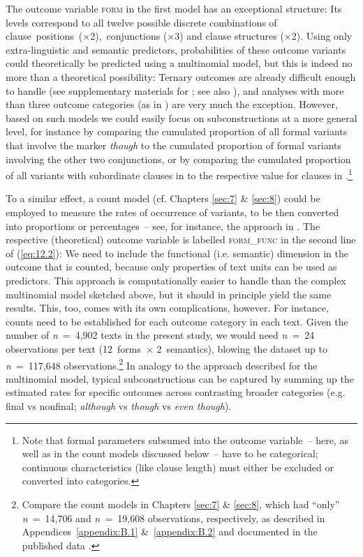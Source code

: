The outcome variable \textsc{form} in the first model has an exceptional structure: Its levels correspond to all twelve possible discrete combinations of clause~positions~(×2),~conjunctions (×3) and clause structures (×2). Using only extra-lin\-guis\-tic and semantic predictors, probabilities of these outcome variants could theoretically be predicted using a multinomial model, but this is indeed no more than a theoretical possibility: Ternary outcomes are already difficult enough to handle (see supplementary materials for ; see also \citealt{FahyEtAl2022}), and analyses with more than three outcome categories (as in \citealt{SchützlerHerzky2021}) are very much the exception. However, based on such models we could easily focus on subconstructions at a more general level, for instance by comparing the cumulated proportion of all formal variants that involve the marker \textit{though} to the cumulated proportion of formal variants involving the other two conjunctions, or by comparing the cumulated proportion of all variants with subordinate clauses in  to the respective value for clauses in .{\footnote{Note that formal parameters subsumed into the outcome variable~– here, as well as in the count models discussed below~– have to be categorical; continuous characteristics (like clause length) must either be excluded or converted into categories.}}

To a similar effect, a count model (cf. Chapters \ref{sec:7} \& \ref{sec:8}) could be employed to measure the rates of occurrence of variants, to be then converted into proportions or percentages~– see, for instance, the approach in \citet{Schützler2022}. The respective (theoretical) outcome variable is labelled \textsc{form\_func} in the second line of (\ref{eq:12.2}): We need to include the functional (i.e. semantic) dimension in the outcome that is counted, because only properties of text units can be used as predictors. This approach is computationally easier to handle than the complex multinomial model sketched above, but it should in principle yield the same results. This, too, comes with its own complications, however. For instance, counts need to be established for each outcome category in each text. Given the number of \textit{n}~=~4,902 texts in the present study, we would need \textit{n}~=~24 observations per text (12~forms~× 2~semantics), blowing the dataset up to \textit{n}~=~117,648 observations.\footnote{Compare the count models in Chapters \ref{sec:7} \& \ref{sec:8}, which had “only” \textit{n}~=~14,706 and \textit{n~}=~19,608 observations, respectively, as described in Appendices~\ref{appendix:B.1} \&~\ref{appendix:B.2} and documented in the published data \citep{Schützler2021}.} In analogy to the approach described for the multinomial model, typical subconstructions can be captured by summing up the estimated rates for specific outcomes across contrasting broader categories (e.g. final vs nonfinal; \textit{although} vs \textit{though} vs \textit{even though}).

